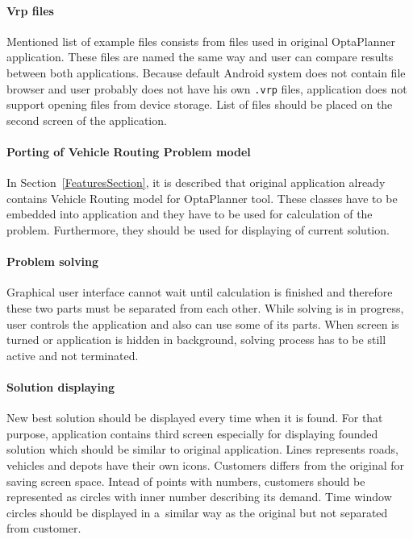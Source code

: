 \paragraph{Vrp files}
Mentioned list of example files consists from files used in original OptaPlanner application. These files are named the
same way and user can compare results between both applications. Because default Android system does not contain file
browser and user probably does not have his own \texttt{.vrp} files, application does not support opening files from
device storage. List of files should be placed on the second screen of the application.

\paragraph{Porting of Vehicle Routing Problem model}
In Section~\ref{FeaturesSection}, it is described that original application already contains Vehicle Routing model for
OptaPlanner tool. These classes have to be embedded into application and they have to be used for calculation of the
problem. Furthermore, they should be used for displaying of current solution.

\paragraph{Problem solving}
Graphical user interface cannot wait until calculation is finished and therefore these two parts must be separated from
each other. While solving is in progress, user controls the application and also can use some of its parts. When screen
is turned or application is hidden in background, solving process has to be still active and not terminated.

\paragraph{Solution displaying}
New best solution should be displayed every time when it is found. For that purpose, application contains third screen
especially for displaying founded solution which should be similar to original application. Lines represents roads,
vehicles and depots have their own icons. Customers differs from the original for saving screen space. Intead of points
with numbers, customers should be represented as circles with inner number describing its demand. Time window circles
should be displayed in a~similar way as the original but not separated from customer.

